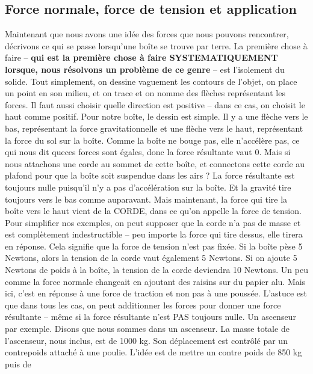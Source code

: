 \documentclass[a4paper, twoside]{article}
\begin{document}
\hypertarget{force-normale-force-de-tension-et-application}{%
\subsection{Force normale, force de tension et
application}\label{force-normale-force-de-tension-et-application}}

Maintenant que nous avons une idée des forces que nous pouvons
rencontrer, décrivons ce qui se passe lorsqu'une boîte se trouve par
terre. La première chose à faire -- \textbf{qui est la première chose à
faire SYSTEMATIQUEMENT lorsque, nous résolvons un problème de ce genre}
-- est l'isolement du solide. Tout simplement, on dessine vaguement les
contours de l'objet, on place un point en son milieu, et on trace et on
nomme des flèches représentant les forces. Il faut aussi choisir quelle
direction est positive -- dans ce cas, on choisit le haut comme positif.
Pour notre boîte, le dessin est simple. Il y a une flèche vers le bas,
représentant la force gravitationnelle et une flèche vers le haut,
représentant la force du sol sur la boîte. Comme la boîte ne bouge pas,
elle n'accélère pas, ce qui nous dit queces forces sont égales, donc la
force résultante vaut 0. Mais si nous attachons une corde au sommet de
cette boîte, et connectons cette corde au plafond pour que la boîte soit
suspendue dans les airs ? La force résultante est toujours nulle
puisqu'il n'y a pas d'accélération sur la boîte. Et la gravité tire
toujours vers le bas comme auparavant. Mais maintenant, la force qui
tire la boîte vers le haut vient de la CORDE, dans ce qu'on appelle la
force de tension. Pour simplifier nos exemples, on peut supposer que la
corde n'a pas de masse et est complètement indestructible -- peu importe
la force qui tire dessus, elle tirera en réponse. Cela signifie que la
force de tension n'est pas fixée. Si la boîte pèse 5 Newtons, alors la
tension de la corde vaut également 5 Newtons. Si on ajoute 5 Newtons de
poids à la boîte, la tension de la corde deviendra 10 Newtons. Un peu
comme la force normale changeait en ajoutant des raisins sur du papier
alu. Mais ici, c'est en réponse à une force de traction et non pas à une
poussée. L'astuce est que dans tous les cas, on peut additionner les
forces pour donner une force résultante -- même si la force résultante
n'est PAS toujours nulle. Un ascenseur par exemple. Disons que nous
sommes dans un ascenseur. La masse totale de l'ascenseur, nous inclus,
est de 1000 kg. Son déplacement est contrôlé par un contrepoids attaché
à une poulie. L'idée est de mettre un contre poids de 850 kg puis de
\end{document}
